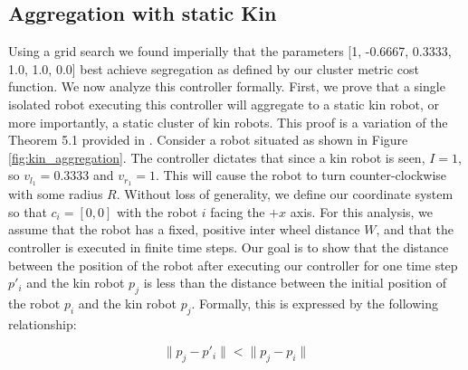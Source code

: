 \documentclass[conference]{IEEEtran}
\begin{document}
  \subsection{Aggregation with static Kin}

    Using a grid search we found imperially that the parameters [1, -0.6667, 0.3333, 1.0, 1.0, 0.0] best achieve segregation as defined by our cluster metric cost function. We now analyze this controller formally. First, we prove that a single isolated robot executing this controller will aggregate to a static kin robot, or more importantly, a static cluster of kin robots. This proof is a variation of the Theorem 5.1 provided in \cite{gauci_self-organized_2014}. Consider a robot situated as shown in Figure \ref{fig:kin_aggregation}. The controller dictates that since a kin robot is seen, $I=1$, so $v_{l_1} = 0.3333$ and $v_{r_1} = 1$. This will cause the robot to turn counter-clockwise with some radius $R$. Without loss of generality, we define our coordinate system so that $c_i=[0,0]$ with the robot $i$ facing the $+x$ axis. For this analysis, we assume that the robot has a fixed, positive inter wheel distance $W$, and that the controller is executed in finite time steps. Our goal is to show that the distance between the position of the robot after executing our controller for one time step $p'_i$ and the kin robot $p_j$ is less than the distance between the initial position of the robot $p_i$ and the kin robot $p_j$. Formally, this is expressed by the following relationship:

    \begin{equation} \label{eq:agg}
      \lVert p_j - p'_i \rVert < \lVert p_j - p_i \rVert
    \end{equation}
\end{document}
